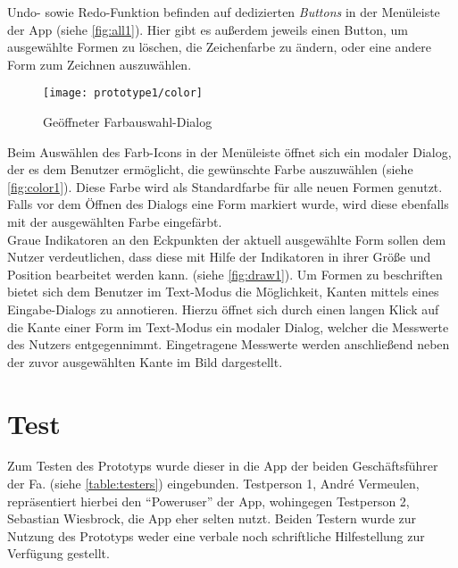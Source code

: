 Undo- sowie Redo-Funktion befinden auf dedizierten \emph{Buttons} in der Menüleiste der App (siehe \autoref{fig:all1}).
Hier gibt es außerdem jeweils einen Button, um ausgewählte Formen zu löschen, die Zeichenfarbe zu ändern, oder eine andere Form zum Zeichnen auszuwählen. \\

\begin{wrapfigure}{R}{0.4\textwidth}
  \centering
  \texttt{[image: prototype1/color]}
  \caption{Geöffneter Farbauswahl-Dialog}
  \label{fig:color1}
\end{wrapfigure}

Beim Auswählen des Farb-Icons in der Menüleiste öffnet sich ein modaler Dialog, der es dem Benutzer ermöglicht, die gewünschte Farbe auszuwählen (siehe \autoref{fig:color1}).
Diese Farbe wird als Standardfarbe für alle neuen Formen genutzt.
Falls vor dem Öffnen des Dialogs eine Form markiert wurde, wird diese ebenfalls mit der ausgewählten Farbe eingefärbt. \\

Graue Indikatoren an den Eckpunkten der aktuell ausgewählte Form sollen dem Nutzer verdeutlichen, dass diese mit Hilfe der Indikatoren in ihrer Größe und Position bearbeitet werden kann. (siehe \autoref{fig:draw1}).
Um Formen zu beschriften bietet sich dem Benutzer im Text-Modus die Möglichkeit, Kanten mittels eines Eingabe-Dialogs zu annotieren.
Hierzu öffnet sich durch einen langen Klick auf die Kante einer Form im Text-Modus ein modaler Dialog, welcher die Messwerte des Nutzers entgegennimmt.
Eingetragene Messwerte werden anschließend neben der zuvor ausgewählten Kante im Bild dargestellt. 


\section{Test}\label{sec:test1}
Zum Testen des Prototyps wurde dieser in die App der beiden Geschäftsführer der Fa. \vr{} (siehe \autoref{table:testers}) eingebunden.
Testperson 1, André Vermeulen, repräsentiert hierbei den ``Poweruser'' der App, wohingegen Testperson 2, Sebastian Wiesbrock, die App eher selten nutzt.
Beiden Testern wurde zur Nutzung des Prototyps weder eine verbale noch schriftliche Hilfestellung zur Verfügung gestellt.

